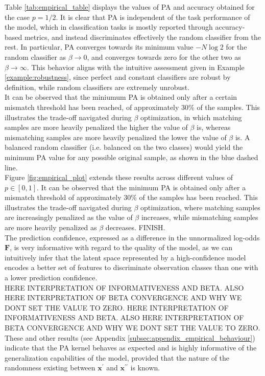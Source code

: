 Table \ref{tab:empirical_table} displays the values of PA and accuracy
obtained for the case $p = 1/2$. It is clear that PA is independent of the task performance
of the model, which in classification tasks is mostly reported through accuracy-based metrics, and 
instead discriminates effectively the random classifier from the rest. In particular, 
PA converges towards its minimum value $-N \log{2}$ for the random classifier 
as $\beta \longrightarrow 0$, and converges towards zero for the 
other two as $\beta \longrightarrow \infty$. This behavior aligns with the 
intuitive assessment given in Example \ref{example:robustness}, since perfect and constant 
classifiers are robust by definition, while random classifiers are extremely unrobust. \\

 It can be observed that the miniumum PA is obtained only after 
a certain mismatch threshold has been reached, of approximately 30\% of the samples. 
This illustrates the trade-off navigated during $\beta$ optimization, in which 
matching samples are more heavily penalized the higher the value of $\beta$ is,
whereas mismatching samples are more heavily penalized the lower the value of $\beta$ is.
A balanced random classifier (i.e. balanced on the two classes) would yield the minimum
PA value for any possible original sample, as shown in the blue dashed line.\\

Figure \ref{fig:empirical_plot} extends these results across different values of 
$p \in [0,1]$. It can be observed that the minimum PA is obtained only after a mismatch 
threshold of approximately 30\% of the samples has been reached. This illustrates the 
trade-off navigated during $\beta$ optimization, where matching samples are increasingly penalized 
as the value of $\beta$ increases, while mismatching samples are more heavily penalized 
as $\beta$ decreases. FINISH. \\

The prediction confidence, expressed as a difference in  the unnormalized log-odds $\bm{F}$, 
is very informative with regard to the quality of the model, as we can intuitively infer that the latent 
space represented by a high-confidence model encodes a better set of features 
to discriminate observation classes than one with a lower prediction confidence. \\

HERE INTERPRETATION OF INFORMATIVENESS AND BETA. ALSO HERE INTERPRETATION OF BETA CONVERGENCE AND 
WHY WE DONT SET THE VALUE TO ZERO. HERE INTERPRETATION OF INFORMATIVENESS AND BETA. 
ALSO HERE INTERPRETATION OF BETA CONVERGENCE AND WHY WE DONT SET THE VALUE TO ZERO.
These and other results (see Appendix \ref{subsec:appendix_empirical_behaviour}) indicate
that the PA kernel behaves as expected and is highly informative of the generalization
capabilities of the model, provided that the nature of the randomness existing
between $\bm{x}^\prime$ and $\bm{x}^{\prime \prime}$ is known. \\

